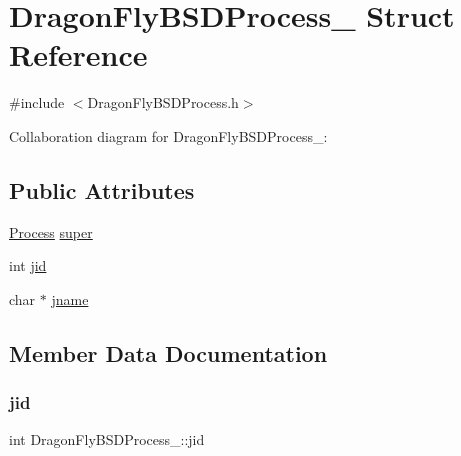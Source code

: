 \hypertarget{structDragonFlyBSDProcess__}{}\section{Dragon\+Fly\+B\+S\+D\+Process\+\_\+ Struct Reference}
\label{structDragonFlyBSDProcess__}


{\ttfamily \#include $<$Dragon\+Fly\+B\+S\+D\+Process.\+h$>$}



Collaboration diagram for Dragon\+Fly\+B\+S\+D\+Process\+\_\+\+:
\subsection*{Public Attributes}
\begin{DoxyCompactItemize}
\item 
\hyperlink{Process_8h_a20673e8fa40981a168bf0e196c4cef3b}{Process} \hyperlink{structDragonFlyBSDProcess___acc7b43394aa423b2254c426f882165a2}{super}
\item 
int \hyperlink{structDragonFlyBSDProcess___ae4e4e16aee8e33dfc4b94b4ff772ddb3}{jid}
\item 
char $\ast$ \hyperlink{structDragonFlyBSDProcess___a70f1830fd6ce3aac6a4bae14020e0426}{jname}
\end{DoxyCompactItemize}


\subsection{Member Data Documentation}
\mbox{\label{structDragonFlyBSDProcess___ae4e4e16aee8e33dfc4b94b4ff772ddb3}} 
\subsubsection{\texorpdfstring{jid}{jid}}
{\footnotesize\ttfamily int Dragon\+Fly\+B\+S\+D\+Process\+\_\+\+::jid}

\mbox{\label{structDragonFlyBSDProcess___a70f1830fd6ce3aac6a4bae14020e0426}} 
